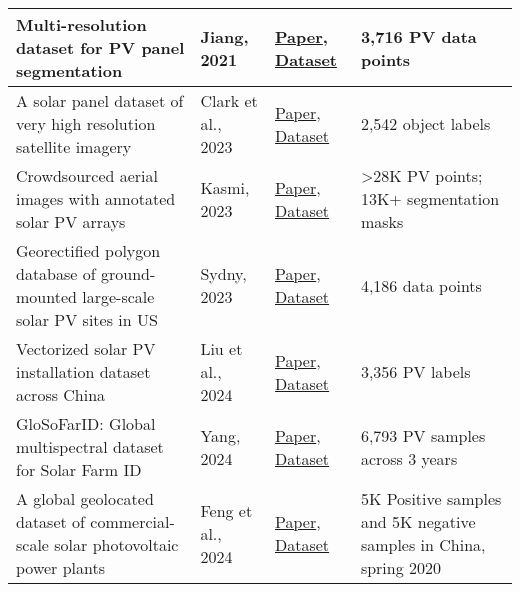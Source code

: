 \begin{multicols}{2}
\begin{table}[htbp]
\begin{tabularx}{0.8\textwidth}{|l|l|X|l|}
            \hline
            Multi-resolution dataset for PV panel segmentation & Jiang, 2021 & \href{https://doi.org/10.5194/essd-13-5389-2021}{Paper}, \href{https://doi.org/10.5281/zenodo.5171712}{Dataset} & 3,716 PV data points \\
            \hline
            A solar panel dataset of very high resolution satellite imagery & Clark et al., 2023 & \href{https://doi.org/10.1038/s41597-023-02539-8}{Paper}, \href{https://doi.org/10.6084/m9.figshare.22081091.v3}{Dataset} & 2,542 object labels \\
            \hline
            Crowdsourced aerial images with annotated solar PV arrays & Kasmi, 2023 & \href{https://doi.org/10.1038/s41597-023-01951-4}{Paper}, \href{https://doi.org/10.5281/zenodo.6865878}{Dataset} & >28K PV points; 13K+ segmentation masks \\
            \hline
            Georectified polygon database of ground-mounted large-scale solar PV sites in US & Sydny, 2023 & \href{https://doi.org/10.1038/s41597-023-02644-8}{Paper}, \href{https://www.sciencebase.gov/catalog/item/6671c479d34e84915adb7536}{Dataset} & 4,186 data points \\
            \hline
            Vectorized solar PV installation dataset across China & Liu et al., 2024 & \href{https://doi.org/10.1038/s41597-024-04356-z}{Paper}, \href{https://github.com/qingfengxitu/ChinaPV}{Dataset} & 3,356 PV labels \\
            \hline
            GloSoFarID: Global multispectral dataset for Solar Farm ID & Yang, 2024 & \href{https://doi.org/10.48550/arXiv.2404.05180}{Paper}, \href{https://github.com/yzyly1992/GloSoFarID/tree/main/data_coordinates}{Dataset} & 6,793 PV samples across 3 years \\
            \hline
            A global geolocated dataset of commercial-scale solar photovoltaic power plants & Feng et al., 2024 & \href{https://doi.org/10.1038/s41597-024-02994-x}{Paper}, \href{https://doi.org/10.57760/sciencedb.o00121.00001}{Dataset} & 5K Positive samples and 5K negative samples in China, spring 2020 \\
            \hline
        \end{tabularx}
        \label{tab:pv_datasets}
    \end{table}


\end{multicols}
